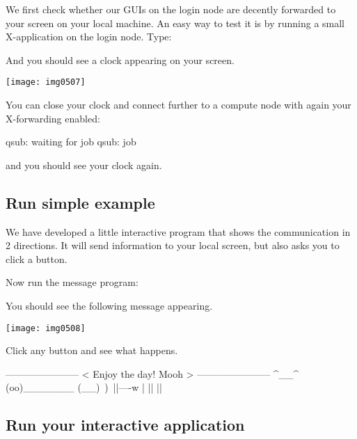 We first check whether our GUIs on the login node are decently forwarded to
your screen on your local machine. An easy way to test it is by running a small
X-application on the login node. Type:

\begin{prompt}
\end{prompt}

And you should see a clock appearing on your screen.

\texttt{[image: img0507]}

You can close your clock and connect further to a compute node with again your
X-forwarding enabled:

\begin{prompt}
qsub: waiting for job %
qsub: job %
\end{prompt}

and you should see your clock again.
\fi

\subsection{Run simple example}

We have developed a little interactive program that shows the communication in
2 directions. It will send information to your local screen, but also asks you
to click a button.

Now run the message program:
\begin{prompt}
\end{prompt}

You should see the following message appearing.

\texttt{[image: img0508]}

Click any button and see what happens.

\begin{prompt}
-----------------------
< Enjoy the day! Mooh >
-----------------------
     ^__^
     (oo)\_______
     (__)\       )\/\
         ||----w |
         ||     ||

\end{prompt}

\subsection{Run your interactive application}

